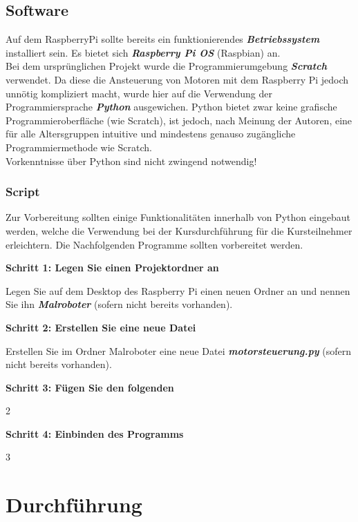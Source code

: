 \documentclass[12pt]{article}
\let\oldemph\emph
\renewcommand{\emph}[1]{\textbf{\oldemph{#1}}}
\newcommand{\schritt}[3]{
\begin{tcolorbox}
  \textbf{Schritt #1: #2}
\end{tcolorbox}
#3
}
\begin{document}
\subsection{Software}
Auf dem RaspberryPi sollte bereits ein funktionierendes \emph{Betriebssystem} installiert sein. Es bietet sich \emph{Raspberry Pi OS} (Raspbian) an. \\

Bei dem ursprünglichen Projekt wurde die Programmierumgebung \emph{Scratch} verwendet. Da diese die Ansteuerung von Motoren mit dem Raspberry Pi jedoch unnötig kompliziert macht, wurde hier auf die Verwendung der Programmiersprache \emph{Python} ausgewichen. Python bietet zwar keine grafische Programmieroberfläche (wie Scratch), ist jedoch, nach Meinung der Autoren, eine für alle Altersgruppen intuitive und mindestens genauso zugängliche Programmiermethode wie Scratch.\\

Vorkenntnisse über Python sind nicht zwingend notwendig!

\subsubsection{Script}
Zur Vorbereitung sollten einige Funktionalitäten innerhalb von Python eingebaut werden, welche die Verwendung bei der Kursdurchführung für die Kursteilnehmer erleichtern. Die Nachfolgenden Programme sollten vorbereitet werden.\\

\schritt{1}{Legen Sie einen Projektordner an}{

  Legen Sie auf dem Desktop des Raspberry Pi einen neuen Ordner an und nennen Sie ihn \emph{Malroboter} (sofern nicht bereits vorhanden).\\

}

\schritt{2}{Erstellen Sie eine neue Datei}{

  Erstellen Sie im Ordner Malroboter eine neue Datei \emph{motorsteuerung.py} (sofern nicht bereits vorhanden).\\

}

\schritt{3}{Fügen Sie den folgenden}{2}


\schritt{4}{Einbinden des Programms}{3}


\section{Durchführung}
\end{document}
